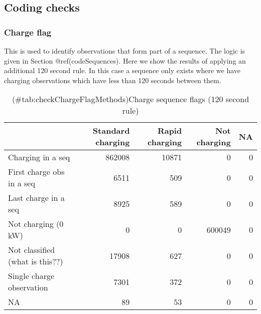 \documentclass[]{article}
\newenvironment{Shaded}{\begin{snugshade}}{\end{snugshade}}
\newcommand{\DataTypeTok}[1]{\textcolor[rgb]{0.13,0.29,0.53}{#1}}
\newcommand{\KeywordTok}[1]{\textcolor[rgb]{0.13,0.29,0.53}{\textbf{#1}}}
\newcommand{\NormalTok}[1]{#1}
\newcommand{\OperatorTok}[1]{\textcolor[rgb]{0.81,0.36,0.00}{\textbf{#1}}}
\newcommand{\StringTok}[1]{\textcolor[rgb]{0.31,0.60,0.02}{#1}}
\begin{document}
\hypertarget{coding-checks}{%
\subsection{Coding checks}\label{coding-checks}}

\hypertarget{chargeFlagTest}{%
\subsubsection{Charge flag}\label{chargeFlagTest}}

This is used to identify observations that form part of a sequence. The logic is given in Section @ref(codeSequences). Here we show the results of applying an additional 120 second rule. In this case a sequence only exists where we have charging observations which have less than 120 seconds between them.

\begin{Shaded}
\end{Shaded}

\begin{table}[t]

\caption{(\#tab:checkChargeFlagMethods)Charge sequence flags (120 second rule)}
\centering
\begin{tabular}{l|r|r|r|r}
\hline
  & Standard charging & Rapid charging & Not charging & NA\\
\hline
Charging in a seq & 862008 & 10871 & 0 & 0\\
\hline
First charge obs in a seq & 6511 & 509 & 0 & 0\\
\hline
Last charge in a seq & 8925 & 589 & 0 & 0\\
\hline
Not charging (0 kW) & 0 & 0 & 600049 & 0\\
\hline
Not classified (what is this??) & 17908 & 627 & 0 & 0\\
\hline
Single charge observation & 7301 & 372 & 0 & 0\\
\hline
NA & 89 & 53 & 0 & 0\\
\hline
\end{tabular}
\end{table}

\begin{Shaded}
\end{Shaded}
\end{document}
